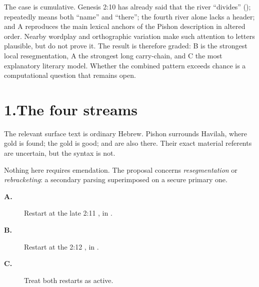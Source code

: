 The case is cumulative. Genesis 2:10 has already said that the river ``divides'' ();  repeatedly means both ``name'' and ``there''; the fourth river alone lacks a  header; and A reproduces the main lexical anchors of the Pishon description in altered order. Nearby wordplay and orthographic variation make such attention to letters plausible, but do not prove it. The result is therefore graded: B is the strongest local resegmentation, A the strongest long carry-chain, and C the most explanatory literary model. Whether the combined pattern exceeds chance is a computational question that remains open.

\section*{1.\quad The four streams}

The relevant surface text is ordinary Hebrew. Pishon surrounds Havilah, where gold is found; the gold is good;  and  are also there. Their exact material referents are uncertain, but the syntax is not.\cite{BDB,Westermann1984}


Nothing here requires emendation. The proposal concerns \emph{resegmentation} or \emph{rebracketing}: a secondary parsing superimposed on a secure primary one.

\begin{description}
\item[\textbf{A.}] Restart at the late 2:11 , in .
\item[\textbf{B.}] Restart at the 2:12 , in .
\item[\textbf{C.}] Treat both restarts as active.
\end{description}

